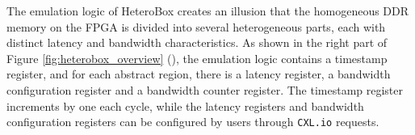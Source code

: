 The emulation logic of HeteroBox creates an illusion that the homogeneous DDR memory on the FPGA is divided into several heterogeneous parts, each with distinct latency and bandwidth characteristics. 
As shown in the right part of Figure \ref{fig:heterobox_overview} (\textcolor{red}{\bone}), the emulation logic contains a timestamp register, and for each abstract region, there is a latency register, a bandwidth configuration register and a bandwidth counter register. The timestamp register increments by one each cycle, while the latency registers and bandwidth configuration registers can be configured by users through \texttt{CXL.io} requests.
